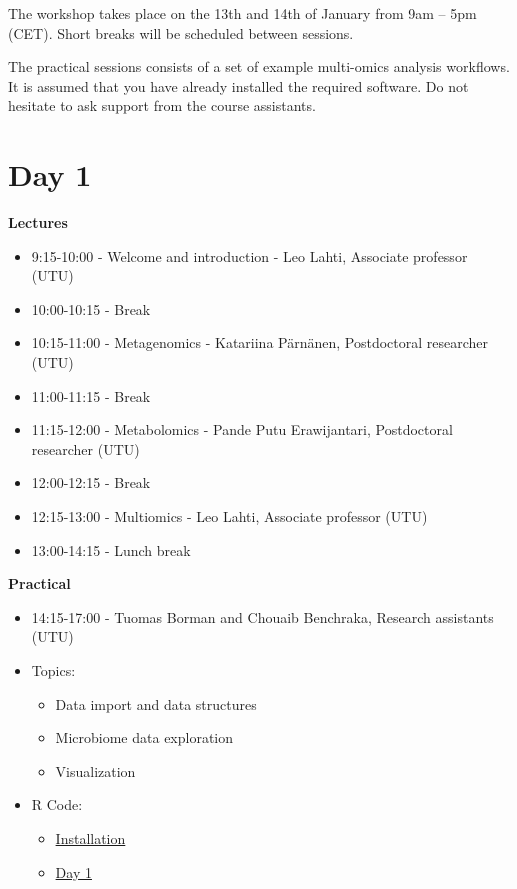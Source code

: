 \documentclass[
  oneside]{book}
\begin{document}
The workshop takes place on the 13th and 14th of January from 9am -- 5pm
(CET). Short breaks will be scheduled between sessions.

The practical sessions consists of a set of example
multi-omics analysis workflows. It is assumed that you
have already installed the required software. Do not hesitate to ask
support from the course assistants.

\hypertarget{day-1}{%
\section{Day 1}\label{day-1}}

\textbf{Lectures}

\begin{itemize}
\item
  9:15-10:00 - Welcome and introduction - Leo Lahti, Associate professor (UTU)
\item
  10:00-10:15 - Break
\item
  10:15-11:00 - Metagenomics - Katariina Pärnänen, Postdoctoral researcher (UTU)
\item
  11:00-11:15 - Break
\item
  11:15-12:00 - Metabolomics - Pande Putu Erawijantari, Postdoctoral researcher (UTU)
\item
  12:00-12:15 - Break
\item
  12:15-13:00 - Multiomics - Leo Lahti, Associate professor (UTU)
\item
  13:00-14:15 - Lunch break
\end{itemize}

\textbf{Practical}

\begin{itemize}
\item
  14:15-17:00 - Tuomas Borman and Chouaib Benchraka, Research assistants (UTU)
\item
  Topics:

  \begin{itemize}
  \item
    Data import and data structures
  \item
    Microbiome data exploration
  \item
    Visualization
  \end{itemize}
\item
  R Code:

  \begin{itemize}
  \item
    \href{install_script.R}{Installation}
  \item
    \href{Day_1.R}{Day 1}
  \end{itemize}
\end{itemize}
\end{document}
